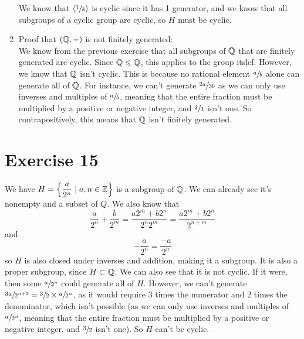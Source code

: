 \documentclass[12pt]{article}
\begin{document}
\begin{enumerate}[label=\textbf{\alph*.}]
            We know that $\langle \sfrac{1}{k} \rangle$ is cyclic
            since it has 1 generator,
            and we know that all subgroups of a cyclic group are cyclic,
            so $H$ must be cyclic. 
        \item
            Proof that $(\mathbb{Q}, +)$ is not finitely generated: \\
            We know from the previous exercise that all subgroups
            of $\mathbb{Q}$ that are finitely generated are cyclic.
            Since $\mathbb{Q} \leqslant \mathbb{Q}$, this applies to the group itslef.
            However, we know that $\mathbb{Q}$ isn't cyclic.
            This is because no rational element $\sfrac{a}{b}$
            alone can generate all of $\mathbb{Q}$.
            For instance,
            we can't generate $\sfrac{2a}{3b}$
            as we can only use inverses and multiples of $\sfrac{a}{b}$,
            meaning that the entire fraction must be multiplied
            by a positive or negative integer,
            and $\sfrac{2}{3}$ isn't one.
            So contrapositively,
            this means that $\mathbb{Q}$ isn't finitely generated.
    \end{enumerate}


    \section*{Exercise 15}
    We have $H = \left\{ \dfrac{a}{2^n} \mid a, n \in \mathbb{Z} \right\}$
    is a subgroup of $\mathbb{Q}$.
    We can already see it's nonempty and a subset of $Q$.
    We also know that
    \[ \dfrac{a}{2^n} + \dfrac{b}{2^m} = \dfrac{a2^m + b2^n}{2^n2^m}
    = \dfrac{a2^m + b2^n}{2^{n + m}} \]
    and
    \[ -\dfrac{a}{2^n} = \dfrac{-a}{2^n} \]
    so $H$ is also closed under inverses and addition,
    making it a subgroup.
    It is also a proper subgroup, since $H \subset \mathbb{Q}$.
    We can also see that it is not cyclic.
    If it were, then some $\sfrac{a}{2^n}$ could generate all of $H$.
    However, we can't generate
    $\sfrac{3a}{2^{n+1}} = \sfrac{3}{2} \times \sfrac{a}{2^n}$,
    as it would require 3 times the numerator
    and 2 times the denominator,
    which isn't possible
    (as we can only use inverses and multiples of $\sfrac{a}{2^n}$,
    meaning that the entire fraction must be multiplied
    by a positive or negative integer,
    and $\sfrac{3}{2}$ isn't one).
    So $H$ can't be cyclic.
\end{document}

